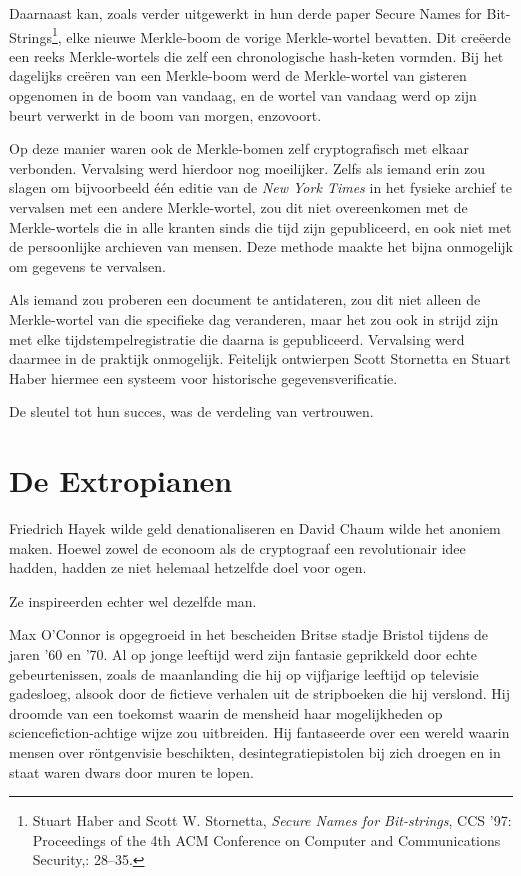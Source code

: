 \documentclass[
  a5paper,
  smalldemyvopaper,11pt,twoside,onecolumn,openright,extrafontsizes,
hidelinks]{memoir}
\begin{document}
Daarnaast kan, zoals verder uitgewerkt in hun derde paper Secure Names
for Bit-Strings\footnote{Stuart Haber and Scott W. Stornetta,
  \emph{Secure Names for Bit-strings}, CCS '97: Proceedings of the 4th
  ACM Conference on Computer and Communications Security,: 28--35.},
elke nieuwe Merkle-boom de vorige Merkle-wortel bevatten. Dit creëerde
een reeks Merkle-wortels die zelf een chronologische hash-keten vormden.
Bij het dagelijks creëren van een Merkle-boom werd de Merkle-wortel van
gisteren opgenomen in de boom van vandaag, en de wortel van vandaag werd
op zijn beurt verwerkt in de boom van morgen, enzovoort.

Op deze manier waren ook de Merkle-bomen zelf cryptografisch met elkaar
verbonden. Vervalsing werd hierdoor nog moeilijker. Zelfs als iemand
erin zou slagen om bijvoorbeeld één editie van de \emph{New York Times}
in het fysieke archief te vervalsen met een andere Merkle-wortel, zou
dit niet overeenkomen met de Merkle-wortels die in alle kranten sinds
die tijd zijn gepubliceerd, en ook niet met de persoonlijke archieven
van mensen. Deze methode maakte het bijna onmogelijk om gegevens te
vervalsen.

Als iemand zou proberen een document te antidateren, zou dit niet alleen
de Merkle-wortel van die specifieke dag veranderen, maar het zou ook in
strijd zijn met elke tijdstempelregistratie die daarna is gepubliceerd.
Vervalsing werd daarmee in de praktijk onmogelijk. Feitelijk ontwierpen
Scott Stornetta en Stuart Haber hiermee een systeem voor historische
gegevensverificatie.

De sleutel tot hun succes, was de verdeling van vertrouwen.

\chapter{De Extropianen}\label{de-extropianen}

Friedrich Hayek wilde geld denationaliseren en David Chaum wilde het
anoniem maken. Hoewel zowel de econoom als de cryptograaf een
revolutionair idee hadden, hadden ze niet helemaal hetzelfde doel voor
ogen.

Ze inspireerden echter wel dezelfde man.

Max O'Connor is opgegroeid in het bescheiden Britse stadje Bristol
tijdens de jaren '60 en '70. Al op jonge leeftijd werd zijn fantasie
geprikkeld door echte gebeurtenissen, zoals de maanlanding die hij op
vijfjarige leeftijd op televisie gadesloeg, alsook door de fictieve
verhalen uit de stripboeken die hij verslond. Hij droomde van een
toekomst waarin de mensheid haar mogelijkheden op sciencefiction-achtige
wijze zou uitbreiden. Hij fantaseerde over een wereld waarin mensen over
röntgenvisie beschikten, desintegratiepistolen bij zich droegen en in
staat waren dwars door muren te lopen.
\end{document}
